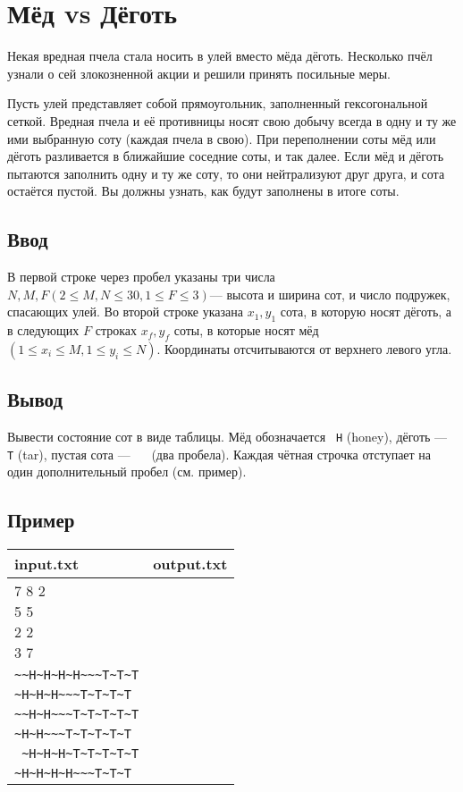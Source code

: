 \documentclass[12pt, oneside]{article}
\begin{document}
\section{Мёд vs Дёготь}

Некая вредная пчела стала носить в улей вместо мёда дёготь. Несколько пчёл 
узнали о сей злокозненной акции и решили принять посильные меры.

Пусть улей представляет собой прямоугольник, заполненный гексогональной сеткой. 
Вредная пчела и её противницы носят свою добычу всегда в одну и ту же ими 
выбранную соту (каждая пчела в свою). При переполнении соты мёд или дёготь 
разливается в ближайшие соседние соты, и так далее. Если мёд и дёготь пытаются 
заполнить одну и ту же соту, то они нейтрализуют друг друга, и сота остаётся пустой. 
Вы должны узнать, как будут заполнены в итоге соты.

\subsection*{Ввод}

В первой строке через пробел указаны три числа $ N, M, F (2\leq{}M, N\leq30, 1\leq{}F\leq{}3) $--- 
высота и ширина сот, и число подружек, спасающих улей. Во второй строке указана $ x_{1}, y_{1} $ сота, 
в которую носят дёготь,  а в следующих $ F $ строках $ x_{f}, y_{f} $ соты, в которые носят мёд 
$ (1\leq{}x_{i}\leq{}M,1\leq{}y_{i}\leq{}N) $.  Координаты отсчитываются от верхнего левого угла.

\subsection*{Вывод}

Вывести состояние сот в виде таблицы. Мёд обозначается \verb*" H" (honey), дёготь --- \verb*" T" (tar), 
пустая сота --- \verb*"  " (два пробела). Каждая чётная строчка отступает 
на один дополнительный пробел (см. пример).

\subsection*{Пример}

\begin{tabular}{|p{}|p{}|}
\hline
input.txt &output.txt \\\hline
\makecell[tl]{7 8 2\\5 5\\2 2\\3 7}
&\makecell[tl]{\verb"~H~H~H~H~H~~~T~T"\\\verb"~~H~H~H~H~~~T~T~T"\\\verb"~H~H~H~~~T~T~T~T"
\\\verb"~~H~H~~~T~T~T~T~T"\\\verb"~H~H~~~T~T~T~T~T"\\\verb" ~H~H~H~T~T~T~T~T"
\\\verb"~H~H~H~H~~~T~T~T"} \\\hline
\end{tabular}
\end{document}

